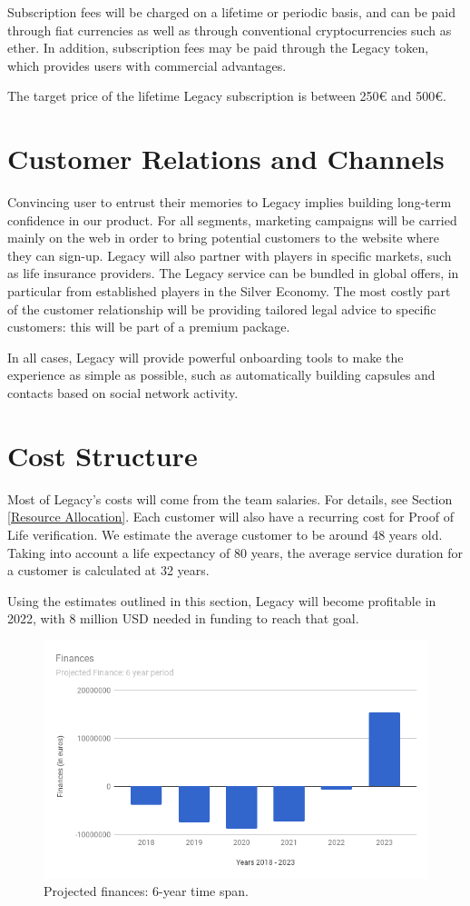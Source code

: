 Subscription fees will be charged on a lifetime or periodic basis, and can be paid through fiat currencies as well as through conventional cryptocurrencies such as ether. In addition, subscription fees may be paid through the Legacy token, which provides users with commercial advantages.

The target price of the lifetime Legacy subscription is between 250€ and 500€.

\section{Customer Relations and Channels} %
\label{sec:customer_relations_and_channels}
Convincing user to entrust their memories to Legacy implies building long-term confidence in our product.
For all segments, marketing campaigns will be carried mainly on the web in order to bring potential customers to the website where they can sign-up.
Legacy will also partner with players in specific markets, such as life insurance providers. The Legacy service can be bundled in global offers, in particular from established players in the Silver Economy.
The most costly part of the customer relationship will be providing tailored legal advice to specific customers: this will be part of a premium package.

In all cases, Legacy will provide powerful onboarding tools to make the experience as simple as possible, such as automatically building capsules and contacts based on social network activity.

\section{Cost Structure} %
\label{sec:cost_structure}
Most of Legacy’s costs will come from the team salaries. For details, see Section \ref{Resource Allocation}.
Each customer will also have a recurring cost for Proof of Life verification. We estimate the average customer to be around 48 years old. Taking into account a life expectancy of 80 years, the average service duration for a customer is calculated at 32 years.

Using the estimates outlined in this section, Legacy will become profitable in 2022, with 8 million USD needed in funding to reach that goal.

\begin{figure}[h]
  \centering
  \includegraphics[scale=0.5]{fig/finances_chart}
  \caption{Projected finances: 6-year time span.}
  \label{fig:ACRDA_SIC}
\end{figure} 


